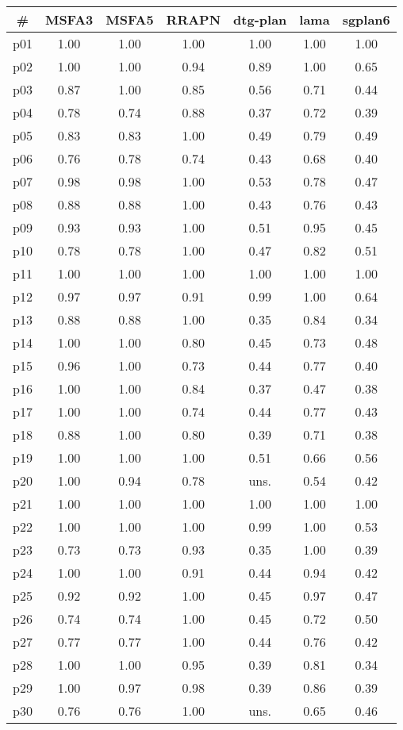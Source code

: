 \begin{tabular}{ccccccc}
\toprule
\textbf{\#} & \textbf{MSFA3} & \textbf{MSFA5} & \textbf{RRAPN} & \textbf{dtg-plan} & \textbf{lama} & \textbf{sgplan6}\\
\midrule
p01 & 1.00 & 1.00 & 1.00 & 1.00 & 1.00 & 1.00\\
p02 & 1.00 & 1.00 & 0.94 & 0.89 & 1.00 & 0.65\\
p03 & 0.87 & 1.00 & 0.85 & 0.56 & 0.71 & 0.44\\
p04 & 0.78 & 0.74 & 0.88 & 0.37 & 0.72 & 0.39\\
p05 & 0.83 & 0.83 & 1.00 & 0.49 & 0.79 & 0.49\\
p06 & 0.76 & 0.78 & 0.74 & 0.43 & 0.68 & 0.40\\
p07 & 0.98 & 0.98 & 1.00 & 0.53 & 0.78 & 0.47\\
p08 & 0.88 & 0.88 & 1.00 & 0.43 & 0.76 & 0.43\\
p09 & 0.93 & 0.93 & 1.00 & 0.51 & 0.95 & 0.45\\
p10 & 0.78 & 0.78 & 1.00 & 0.47 & 0.82 & 0.51\\
p11 & 1.00 & 1.00 & 1.00 & 1.00 & 1.00 & 1.00\\
p12 & 0.97 & 0.97 & 0.91 & 0.99 & 1.00 & 0.64\\
p13 & 0.88 & 0.88 & 1.00 & 0.35 & 0.84 & 0.34\\
p14 & 1.00 & 1.00 & 0.80 & 0.45 & 0.73 & 0.48\\
p15 & 0.96 & 1.00 & 0.73 & 0.44 & 0.77 & 0.40\\
p16 & 1.00 & 1.00 & 0.84 & 0.37 & 0.47 & 0.38\\
p17 & 1.00 & 1.00 & 0.74 & 0.44 & 0.77 & 0.43\\
p18 & 0.88 & 1.00 & 0.80 & 0.39 & 0.71 & 0.38\\
p19 & 1.00 & 1.00 & 1.00 & 0.51 & 0.66 & 0.56\\
p20 & 1.00 & 0.94 & 0.78 & uns. & 0.54 & 0.42\\
p21 & 1.00 & 1.00 & 1.00 & 1.00 & 1.00 & 1.00\\
p22 & 1.00 & 1.00 & 1.00 & 0.99 & 1.00 & 0.53\\
p23 & 0.73 & 0.73 & 0.93 & 0.35 & 1.00 & 0.39\\
p24 & 1.00 & 1.00 & 0.91 & 0.44 & 0.94 & 0.42\\
p25 & 0.92 & 0.92 & 1.00 & 0.45 & 0.97 & 0.47\\
p26 & 0.74 & 0.74 & 1.00 & 0.45 & 0.72 & 0.50\\
p27 & 0.77 & 0.77 & 1.00 & 0.44 & 0.76 & 0.42\\
p28 & 1.00 & 1.00 & 0.95 & 0.39 & 0.81 & 0.34\\
p29 & 1.00 & 0.97 & 0.98 & 0.39 & 0.86 & 0.39\\
p30 & 0.76 & 0.76 & 1.00 & uns. & 0.65 & 0.46\\
\bottomrule
\end{tabular}

